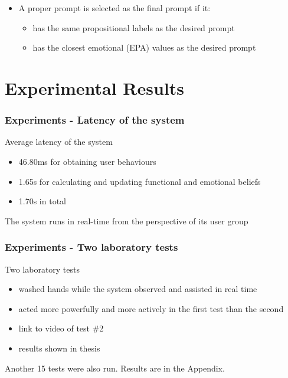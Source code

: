 \documentclass{beamer}
\begin{document}
\begin{frame}
\begin{itemize}
\begin{figure}[htb]
\begin{subfigure}[b]{.4\textwidth}
\end{subfigure}
\end{figure}
\item A proper prompt is selected as the final prompt if it:
\begin{itemize}
\item has the same propositional labels as the desired prompt
\item has the closest emotional (EPA) values as the desired prompt
\end{itemize}
\end{itemize}
\end{frame}

\section{Experimental Results}
\begin{frame}
\frametitle{Experiments - Latency of the system}
Average latency of the system
\begin{itemize} 
\item 46.80ms for obtaining user behaviours
\item 1.65s for calculating and updating functional and emotional beliefs
\item 1.70s in total
\end{itemize}
\vspace{.3cm}
The system runs in real-time from the perspective of its user group
\end{frame}

\begin{frame}
\frametitle{Experiments - Two laboratory tests}
Two laboratory tests
\begin{itemize}
\item washed hands while the system observed and assisted in real time
\item acted more powerfully and more actively in the first test than the second
\item link to video of test \#2
\item results shown in thesis
\end{itemize}
\vspace{.3cm}
Another 15 tests were also run. Results are in the Appendix.
\end{frame}
\end{document}
